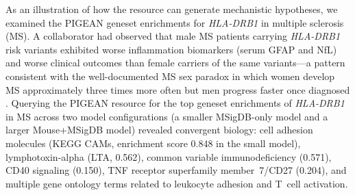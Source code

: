 

As an illustration of how the resource can generate mechanistic hypotheses, we examined the PIGEAN geneset enrichments for \textit{HLA-DRB1} in multiple sclerosis (MS). A collaborator had observed that male MS patients carrying \textit{HLA-DRB1} risk variants exhibited worse inflammation biomarkers (serum GFAP and NfL) and worse clinical outcomes than female carriers of the same variants---a pattern consistent with the well-documented MS sex paradox in which women develop MS approximately three times more often but men progress faster once diagnosed \cite{voskuhl_sex_2020}. Querying the PIGEAN resource for the top geneset enrichments of \textit{HLA-DRB1} in MS across two model configurations (a smaller MSigDB-only model and a larger Mouse+MSigDB model) revealed convergent biology: cell adhesion molecules (KEGG CAMs, enrichment score 0.848 in the small model), lymphotoxin-alpha (LTA, 0.562), common variable immunodeficiency (0.571), CD40 signaling (0.150), TNF receptor superfamily member~7/CD27 (0.204), and multiple gene ontology terms related to leukocyte adhesion and T~cell activation.


